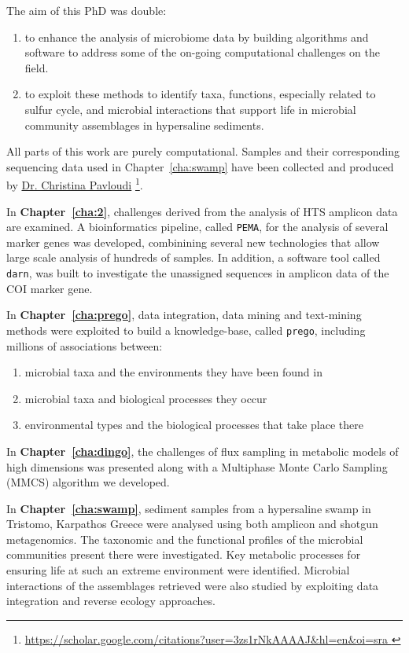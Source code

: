    The aim of this PhD was double:
   \begin{enumerate}
      \item to enhance the analysis of microbiome data by building algorithms and software 
            to address some of the on-going computational challenges on the field.
      \item to exploit these methods to identify taxa, functions, especially related to sulfur cycle, 
            and microbial interactions that support life in microbial community assemblages in hypersaline sediments.
   \end{enumerate}
   All parts of this work are purely computational. 
   Samples and their corresponding sequencing data used in Chapter~\ref{cha:swamp} have been collected 
   and produced by 
   \href{https://scholar.google.com/citations?user=3zs1rNkAAAAJ&hl=en&oi=sra}{Dr. Christina Pavloudi} \footnote{
      \href{https://scholar.google.com/citations?user=3zs1rNkAAAAJ&hl=en&oi=sra}{
         https://scholar.google.com/citations?user=3zs1rNkAAAAJ\&hl=en\&oi=sra
      }
   }. 

   In \textbf{Chapter~\ref{cha:2}}, challenges derived from the analysis of HTS amplicon data are examined.
   A bioinformatics pipeline, called \texttt{PEMA}, for the analysis of several marker genes was developed, combinining several new technologies that allow large scale analysis of hundreds of samples. 
   In addition, a software tool called \texttt{darn}, was built to investigate the unassigned sequences in amplicon data of the COI marker gene. 

   In \textbf{Chapter~\ref{cha:prego}}, data integration, data mining and text-mining methods were exploited to build a knowledge-base, called \texttt{prego}, including millions of associations between:
   \begin{enumerate}
      \item microbial taxa and the environments they have been found in 
      \item microbial taxa and biological processes they occur
      \item environmental types and the biological processes that take place there
   \end{enumerate}

   In \textbf{Chapter~\ref{cha:dingo}}, the challenges of flux sampling in metabolic models of high dimensions was presented along with a Multiphase Monte Carlo Sampling (MMCS) algorithm we developed. 

   In \textbf{Chapter~\ref{cha:swamp}}, sediment samples from a hypersaline swamp in Tristomo, Karpathos Greece were analysed using both amplicon and shotgun metagenomics. 
   The taxonomic and the functional profiles of the microbial communities present there were investigated. 
   Key metabolic processes for ensuring life at such an extreme environment were identified.
   Microbial interactions of the assemblages retrieved were also studied by exploiting 
   data integration and reverse ecology approaches.  

